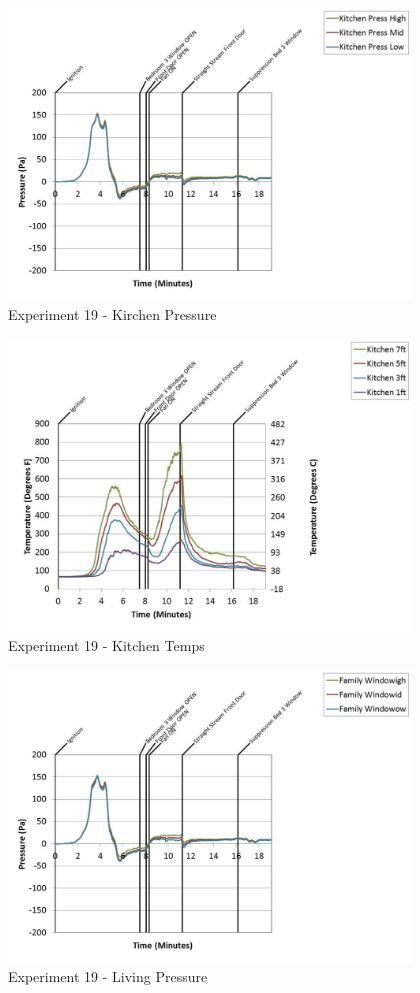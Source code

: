 \documentclass{article}
\begin{document}
\begin{appendices}
	\clearpage

	\begin{figure}[h!]
		\centering
		\includegraphics[height=3.05in]{0_Images/Results_Charts/Exp_19_Charts/KirchenPressure.pdf}
		\caption{Experiment 19 - Kirchen Pressure}
	\end{figure}
 

	\begin{figure}[h!]
		\centering
		\includegraphics[height=3.05in]{0_Images/Results_Charts/Exp_19_Charts/KitchenTemps.pdf}
		\caption{Experiment 19 - Kitchen Temps}
	\end{figure}
 
	\clearpage

	\begin{figure}[h!]
		\centering
		\includegraphics[height=3.05in]{0_Images/Results_Charts/Exp_19_Charts/LivingPressure.pdf}
		\caption{Experiment 19 - Living Pressure}
	\end{figure}
 


\end{appendices}
\end{document}
